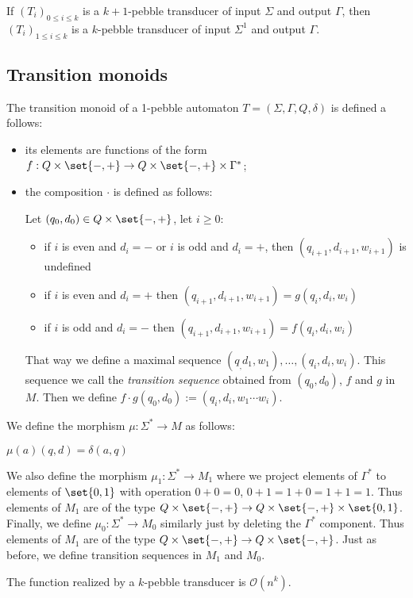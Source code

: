 \begin{remark}
If $(T_i)_{0 \leq i\leq k}$ is a $k+1$-pebble transducer of input $\Sigma$ and output $\Gamma$, then $(T_i)_{1\leq i\leq k}$ is a $k$-pebble transducer of input $\Sigma^1$ and output $\Gamma$.
\end{remark}

\subsection{Transition monoids}

\begin{definition}
The transition monoid of a 1-pebble automaton $T=(\Sigma,\Gamma,Q, \delta)$ is defined a follows:
\begin{itemize}
\item its elements are functions of the form $f:Q\times\set{{-},{+}}\to Q\times\set{{-},{+}}\times \Gamma^*$;
\item the composition $\cdot$ is defined as follows:

Let $(q_0,d_0)\in Q\times \set{{-},{+}}$, let $i\geq 0$:
\begin{itemize}
\item if $i$ is even and $d_i={-}$ or $i$ is odd and $d_i={+}$, then $(q_{i+1},d_{i+1},w_{i+1})$ is undefined
\item if $i$ is even and $d_i={+}$ then $(q_{i+1},d_{i+1},w_{i+1})=g(q_i,d_i,w_i)$
\item if $i$ is odd and $d_i={-}$ then $(q_{i+1},d_{i+1},w_{i+1})=f(q_i,d_i,w_i)$
\end{itemize}
That way we define a maximal sequence $(q_,d_1,w_1),\ldots,(q_i,d_i,w_i)$.
This sequence we call the \emph{transition sequence} obtained from $(q_0,d_0)$, $f$ and $g$ in $M$.
Then we define $f\cdot g(q_0,d_0):=(q_i,d_i,w_1\cdots w_i)$.

\end{itemize}

We define the morphism $\mu:\Sigma^*\to M$ as follows:

$\mu(a)(q,d)=\delta(a,q)$

We also define the morphism $\mu_1:\Sigma^*\to M_1$ where we project elements of $\Gamma^*$ to elements of $\set{0,1}$ with operation $0+0=0$, $0+1=1+0=1+1=1$. Thus elements of $M_1$ are of the type $Q\times\set{{-},{+}}\to Q\times\set{{-},{+}}\times \set{0,1}$.
Finally, we define $\mu_0:\Sigma^*\to M_0$ similarly just by deleting the $\Gamma^*$ component.
Thus elements of $M_1$ are of the type $Q\times\set{{-},{+}}\to Q\times\set{{-},{+}}$.
Just as before, we define transition sequences in $M_1$ and $M_0$.
\end{definition}


\begin{proposition}[\cite{}]
The function realized by a $k$-pebble transducer is $\mathcal{O}(n^k)$.
\end{proposition}